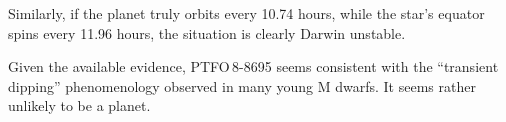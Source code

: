 \documentclass[12pt,twocolumn,tighten]{aastex62}
\begin{document}
Similarly, if the planet truly orbits every 10.74 hours, while the
star's equator spins every 11.96 hours, the situation is clearly
Darwin unstable. 



  Given the available evidence,
  PTFO$\,$8-8695 seems consistent with the
  ``transient dipping'' phenomenology observed in many young M dwarfs.
  It seems rather unlikely to be a planet.




%
%
%
\end{document}
